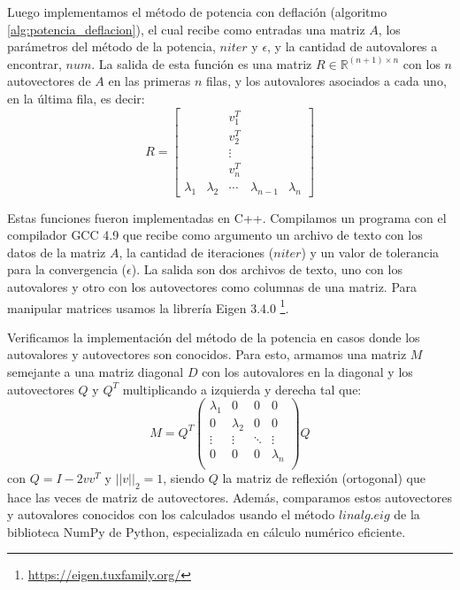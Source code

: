 \documentclass{article}
\begin{document}
Luego implementamos el método de potencia con deflación (algoritmo \ref{alg:potencia_deflacion}), el cual recibe como entradas una matriz $A$, los parámetros del método de la potencia, $niter$ y $\epsilon$, y la cantidad de autovalores a encontrar, $num$. La salida de esta función es una matriz $R \in \mathbb{R}^{(n+1) \times n}$ con los $n$ autovectores de $A$ en las primeras $n$ filas, y los autovalores asociados a cada uno, en la última fila, es decir:
%
\begin{equation*} \nonumber
    R =
    \begin{bmatrix}
                  &           & v_1^T  &               &           \\
                  &           & v_2^T  &               &           \\
                  &           & \vdots &               &           \\
                  &           & v_n^T  &               &           \\
        \lambda_1 & \lambda_2 & \cdots & \lambda_{n-1} & \lambda_n
    \end{bmatrix}
\end{equation*}
%

Estas funciones fueron implementadas en C++. Compilamos un programa con el compilador GCC 4.9 que recibe como argumento un archivo de texto con los datos de la matriz $A$, la cantidad de iteraciones ($niter$) y un valor de tolerancia para la convergencia ($\epsilon$). La salida son dos archivos de texto, uno con los autovalores y otro con los autovectores como columnas de una matriz. Para manipular matrices usamos la librería Eigen 3.4.0 \footnote{\url{https://eigen.tuxfamily.org/}}. 

Verificamos la implementación del método de la potencia en casos donde los autovalores y autovectores son conocidos. Para esto, armamos una matriz $M$ semejante a una matriz diagonal $D$ con los autovalores en la diagonal y los autovectores $Q$ y $Q^T$ multiplicando a izquierda y derecha tal que: 
$$
M = Q^T \begin{pmatrix}
\lambda_1    &0     &0      &0      \\
0      & \lambda_2   &0      &0      \\
\vdots &\vdots&\ddots &\vdots \\
0      &0     &0      & \lambda_n    \\
\end{pmatrix} Q
$$
con $Q = I - 2 v v^T$ y $||v||_2=1$, siendo $Q$ la matriz de reflexión (ortogonal) que hace las veces de matriz de autovectores. Además, comparamos estos autovectores y autovalores conocidos con los calculados usando el método  $linalg.eig$ de la biblioteca NumPy de Python, especializada en cálculo numérico eficiente.
\end{document}
